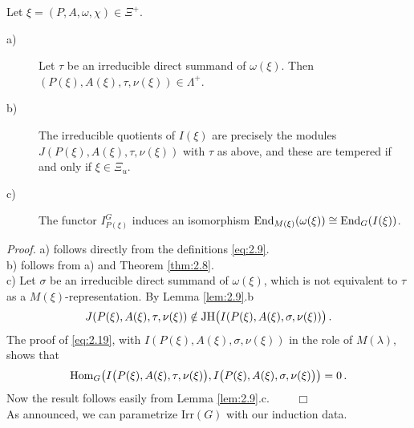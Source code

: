 \begin{prop}\label{prop:2.11}
Let $\xi = (P,A,\omega ,\chi ) \in \Xi^+$.
\begin{description}
\item[a)] Let $\tau$ be an irreducible direct summand of $\omega (\xi )$.
Then $(P(\xi ), A (\xi), \tau ,\nu (\xi )) \in \Lambda^+$.
\item[b)] The irreducible quotients of $I(\xi )$ are precisely the modules
$J (P(\xi ), A (\xi), \tau ,\nu (\xi ))$ with $\tau$ as above, and these
are tempered if and only if $\xi \in \Xi_u$.
\item[c)] The functor $I_{P(\xi )}^G$ induces an isomorphism
$\mathrm{End}_{M(\xi )} (\omega (\xi )) \cong \mathrm{End}_G (I(\xi ))$.
\end{description}
\end{prop}
\emph{Proof.}
a) follows directly from the definitions \eqref{eq:2.9}.\\
b) follows from a) and Theorem \ref{thm:2.8}.\\
c) Let $\sigma$ be an irreducible direct summand of $\omega (\xi )$, which is not 
equivalent to $\tau$ as a $M(\xi )$-representation. By Lemma \ref{lem:2.9}.b 
\[
J(P(\xi ), A (\xi), \tau ,\nu (\xi )) \notin 
\mathrm{JH} \big( I(P(\xi ), A (\xi), \sigma ,\nu (\xi )) \big) \,.
\] 
The proof of \eqref{eq:2.19}, with $I(P(\xi ), A (\xi), \sigma ,\nu (\xi ))$ 
in the role of $M(\lambda )$, shows that 
\[
\mathrm{Hom}_G \big( I \big( P(\xi ), A (\xi), \tau ,\nu (\xi ) \big) 
,I \big( P(\xi ), A (\xi), \sigma ,\nu (\xi ) \big) \big) = 0 \,.
\]
Now the result follows easily from Lemma \ref{lem:2.9}.c. $\qquad \Box$
\\[2mm]

As announced, we can parametrize Irr$(G)$ with our induction data.

